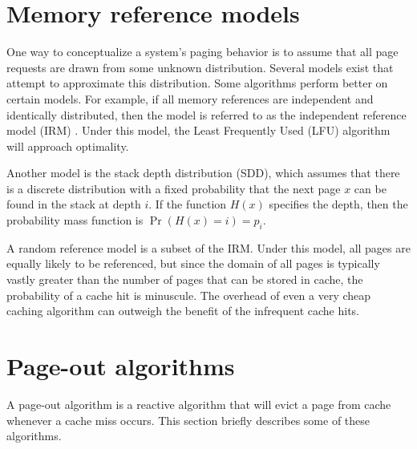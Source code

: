 \section{Memory reference models}
  One way to conceptualize a system's paging behavior is to assume that all page
  requests are drawn from some unknown distribution. Several models exist that
  attempt to approximate this distribution. Some algorithms perform better on
  certain models. For example, if all memory references are independent and
  identically distributed, then the model is referred to as the independent
  reference model (IRM) \cite{arc}. Under this model, the Least Frequently Used
  (LFU) algorithm will approach optimality.

  Another model is the stack depth distribution (SDD), which assumes that
  there is a discrete distribution with a fixed probability that the next page
  $x$ can be found in the stack at depth $i$. If the function $H(x)$ specifies
  the depth, then the probability mass function is $\Pr(H(x) = i) = p_i$.

  A random reference model is a subset of the IRM. Under this model, all pages
  are equally likely to be referenced, but since the domain of all pages is
  typically vastly greater than the number of pages that can be stored in cache,
  the probability of a cache hit is minuscule. The overhead of even a very cheap
  caching algorithm can outweigh the benefit of the infrequent cache hits.

\section{Page-out algorithms}
  A page-out algorithm is a reactive algorithm that will evict a page from cache
  whenever a cache miss occurs. This section briefly describes some of these
  algorithms.


